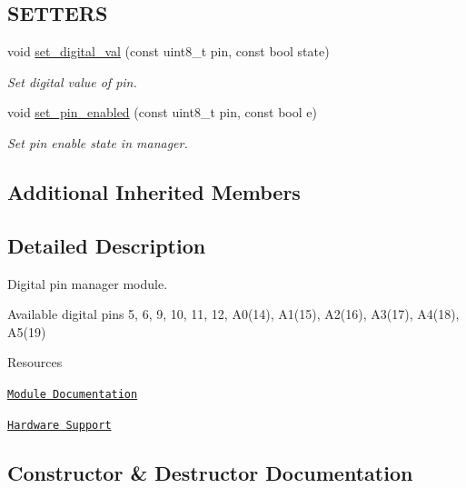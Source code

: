 \subsection*{S\+E\+T\+T\+E\+RS}
\begin{DoxyCompactItemize}
\item 
void \hyperlink{class_loom___digital_a5d34db812f5eb0e8ea824db4f03f9ee5}{set\+\_\+digital\+\_\+val} (const uint8\+\_\+t pin, const bool state)
\begin{DoxyCompactList}\small\item\em Set digital value of pin. \end{DoxyCompactList}\item 
void \hyperlink{class_loom___digital_a27f176ab66e8a1c4403ffe583c592812}{set\+\_\+pin\+\_\+enabled} (const uint8\+\_\+t pin, const bool e)
\begin{DoxyCompactList}\small\item\em Set pin enable state in manager. \end{DoxyCompactList}\end{DoxyCompactItemize}
\subsection*{Additional Inherited Members}


\subsection{Detailed Description}
Digital pin manager module. 

Available digital pins 5, 6, 9, 10, 11, 12, A0(14), A1(15), A2(16), A3(17), A4(18), A5(19)

\begin{DoxyParagraph}{Resources}

\begin{DoxyItemize}
\item \href{https://openslab-osu.github.io/Loom/html/class_loom___digital.html}{\tt Module Documentation}
\item \href{https://github.com/OPEnSLab-OSU/Loom/wiki/Hardware-Support#spi-sensors}{\tt Hardware Support} 
\end{DoxyItemize}
\end{DoxyParagraph}


\subsection{Constructor \& Destructor Documentation}
